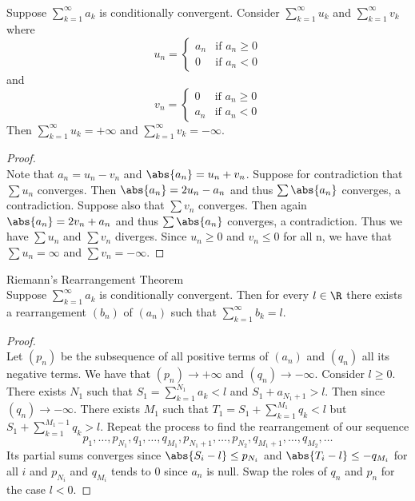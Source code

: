 \documentclass[a4paper]{article}
\begin{document}
\begin{prp}{}{}\\ Suppose $\sum_{k=1}^{\infty}a_k$ is conditionally convergent. Consider $\sum_{k=1}^{\infty}u_k$ and $\sum_{k=1}^{\infty}v_k$ where $$u_n=\begin{cases}
a_n & \text{if $a_n\geq0$} \\
0 & \text{if $a_n<0$}
\end{cases}$$
and
$$v_n=\begin{cases}
0 & \text{if $a_n\geq0$} \\
a_n & \text{if $a_n<0$}
\end{cases}$$
Then $\sum_{k=1}^{\infty}u_k=+\infty$ and $\sum_{k=1}^{\infty}v_k=-\infty$. 
\begin{proof}\\
Note that $a_n=u_n-v_n$ and $\abs{a_n}=u_n+v_n$. Suppose for contradiction that $\sum u_n$ converges. Then $\abs{a_n}=2u_n-a_n$ and thus $\sum\abs{a_n}$ converges, a contradiction. Suppose also that $\sum v_n$ converges. Then again $\abs{a_n}=2v_n+a_n$ and thus $\sum\abs{a_n}$ converges, a contradiction. Thus we have $\sum u_n$ and $\sum v_n$ diverges. Since $u_n\geq 0$ and $v_n\leq 0$ for all n, we have that $\sum u_n=\infty$ and $\sum v_n=-\infty$. 
\end{proof}
\end{prp}

\begin{thm}{Riemann's Rearrangement Theorem}{}\\ Suppose $\sum_{k=1}^{\infty}a_k$ is conditionally convergent. Then for every $l\in\R$ there exists a rearrangement $(b_n)$ of $(a_n)$ such that $\sum_{k=1}^{\infty}b_k=l$. 
\begin{proof}\\
Let $(p_n)$ be the subsequence of all positive terms of $(a_n)$ and $(q_n)$ all its negative terms. We have that $(p_n)\to+\infty$ and $(q_n)\to-\infty$. Consider $l\geq0$. There exists $N_1$ such that $S_1=\sum_{k=1}^{N_1}a_k<l$ and $S_1+a_{N_1+1}>l$. Then since $(q_n)\to-\infty$. There exists $M_1$ such that $T_1=S_1+\sum_{k=1}^{M_1}q_k<l$ but $S_1+\sum_{k=1}^{M_1-1}q_k>l$. Repeat the process to find the rearrangement of our sequence $$p_1,\dots,p_{N_1},q_1,\dots,q_{M_1},p_{N_1+1},\dots,p_{N_2},q_{M_1+1},\dots,q_{M_2},\dots$$
Its partial sums converges since $\abs{S_i-l}\leq p_{N_i}$ and $\abs{T_i-l}\leq -q_{M_i}$ for all $i$ and $p_{N_i}$ and $q_{M_i}$ tends to $0$ since $a_n$ is null. Swap the roles of $q_n$ and $p_n$ for the case $l<0$. 
\end{proof}
\end{thm}
\end{document}
